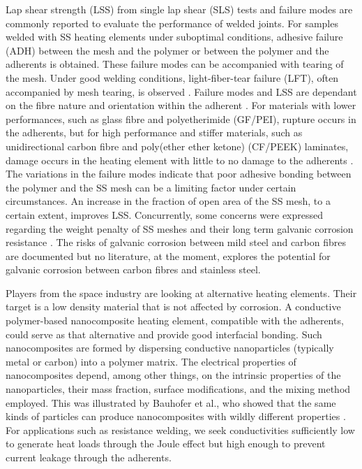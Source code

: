 \documentclass[11pt,review,times]{elsarticle}
\begin{document}
Lap shear strength (LSS) from single lap shear (SLS) tests and failure modes are commonly reported to evaluate the performance of welded joints. 
For samples welded with SS heating elements under suboptimal conditions, adhesive failure (ADH) between the mesh and the polymer or between the polymer and the adherents is obtained. 
These failure modes can be accompanied with tearing of the mesh. 
Under good welding conditions, light-fiber-tear failure (LFT), often accompanied by mesh tearing, is observed \cite{Shi2014}. 
Failure modes and LSS are dependant on the fibre nature and orientation within the adherent \cite{Shi2013a}. 
For materials with lower performances, such as glass fibre and polyetherimide (GF/PEI), rupture occurs in the adherents, but for high performance and stiffer materials, such as unidirectional carbon fibre and poly(ether ether ketone) (CF/PEEK) laminates, damage occurs in the heating element with little to no damage to the adherents \cite{Dube2015}. 
The variations in the failure modes indicate that poor adhesive bonding between the polymer and the SS mesh \cite{Dube2007,Dube2012a,Dube2009a,Shi2014,Shi2015a} can be a limiting factor under certain circumstances. 
An increase in the fraction of open area of the SS mesh, to a certain extent, improves LSS. 
Concurrently, some concerns were expressed regarding the weight penalty of SS meshes and their long term galvanic corrosion resistance \cite{Stavrov2005a}. 
The risks of galvanic corrosion between mild steel and carbon fibres are documented \cite{Tavakkolizadeh2001,Arronche2013} but no literature, at the moment, explores the potential for galvanic corrosion between carbon fibres and stainless steel. 

Players from the space industry are looking at alternative heating elements.  
Their target is a low density material that is not affected by corrosion. 
A conductive polymer-based nanocomposite heating element, compatible with the adherents, could serve as that alternative and provide good interfacial bonding. 
Such nanocomposites are formed by dispersing conductive nanoparticles (typically metal or carbon) into a polymer matrix. 
The electrical properties of nanocomposites depend, among other things, on the intrinsic properties of the nanoparticles, their mass fraction, surface modifications, and the mixing method employed. 
This was illustrated by Bauhofer et al., who showed that the same kinds of particles can produce nanocomposites with wildly different properties \cite{Bauhofer2009}. 
For applications such as resistance welding, we seek conductivities sufficiently low to generate heat loads through the Joule effect but high enough to prevent current leakage through the adherents. 
\end{document}
